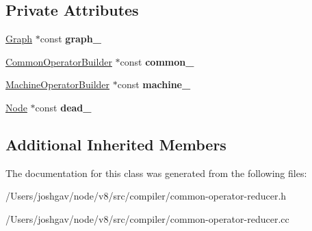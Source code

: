 \subsection*{Private Attributes}
\begin{DoxyCompactItemize}
\item 
\hyperlink{classv8_1_1internal_1_1compiler_1_1_graph}{Graph} $\ast$const {\bfseries graph\+\_\+}\hypertarget{classv8_1_1internal_1_1compiler_1_1_common_operator_reducer_ad9d2481f8f4d2cc4769cc509bb1deb8e}{}\label{classv8_1_1internal_1_1compiler_1_1_common_operator_reducer_ad9d2481f8f4d2cc4769cc509bb1deb8e}

\item 
\hyperlink{classv8_1_1internal_1_1compiler_1_1_common_operator_builder}{Common\+Operator\+Builder} $\ast$const {\bfseries common\+\_\+}\hypertarget{classv8_1_1internal_1_1compiler_1_1_common_operator_reducer_a7859b6cb9b46da9db9c026d9729effa0}{}\label{classv8_1_1internal_1_1compiler_1_1_common_operator_reducer_a7859b6cb9b46da9db9c026d9729effa0}

\item 
\hyperlink{classv8_1_1internal_1_1compiler_1_1_machine_operator_builder}{Machine\+Operator\+Builder} $\ast$const {\bfseries machine\+\_\+}\hypertarget{classv8_1_1internal_1_1compiler_1_1_common_operator_reducer_a3c1f166780ac1007aaeee790dea3b05f}{}\label{classv8_1_1internal_1_1compiler_1_1_common_operator_reducer_a3c1f166780ac1007aaeee790dea3b05f}

\item 
\hyperlink{classv8_1_1internal_1_1compiler_1_1_node}{Node} $\ast$const {\bfseries dead\+\_\+}\hypertarget{classv8_1_1internal_1_1compiler_1_1_common_operator_reducer_a3f56e856c060e2d51b1228453dc58dfb}{}\label{classv8_1_1internal_1_1compiler_1_1_common_operator_reducer_a3f56e856c060e2d51b1228453dc58dfb}

\end{DoxyCompactItemize}
\subsection*{Additional Inherited Members}


The documentation for this class was generated from the following files\+:\begin{DoxyCompactItemize}
\item 
/\+Users/joshgav/node/v8/src/compiler/common-\/operator-\/reducer.\+h\item 
/\+Users/joshgav/node/v8/src/compiler/common-\/operator-\/reducer.\+cc\end{DoxyCompactItemize}
